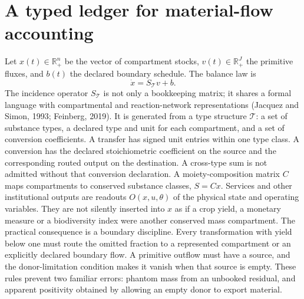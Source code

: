 \documentclass[11pt]{article}
\begin{document}
\section{A typed ledger for material-flow accounting}
Let \(x(t)\in\mathbb{R}_+^n\) be the vector of compartment stocks, \(v(t)\in\mathbb{R}_+^J\) the primitive fluxes, and \(b(t)\) the declared boundary schedule. The balance law is
\[\dot x = S_{\mathcal T}v+b.\]
The incidence operator \(S_{\mathcal T}\) is not only a bookkeeping matrix; it shares a formal language with compartmental and reaction-network representations (Jacquez and Simon, 1993; Feinberg, 2019). It is generated from a type structure \(\mathcal T\): a set of substance types, a declared type and unit for each compartment, and a set of conversion coefficients. A transfer has signed unit entries within one type class. A conversion has the declared stoichiometric coefficient on the source and the corresponding routed output on the destination. A cross-type sum is not admitted without that conversion declaration.
A moiety-composition matrix \(C\) maps compartments to conserved substance classes, \(S=Cx\). Services and other institutional outputs are readouts \(O(x,u,\theta)\) of the physical state and operating variables. They are not silently inserted into \(x\) as if a crop yield, a monetary measure or a biodiversity index were another conserved mass compartment.
The practical consequence is a boundary discipline. Every transformation with yield below one must route the omitted fraction to a represented compartment or an explicitly declared boundary flow. A primitive outflow must have a source, and the donor-limitation condition makes it vanish when that source is empty. These rules prevent two familiar errors: phantom mass from an unbooked residual, and apparent positivity obtained by allowing an empty donor to export material.
\end{document}

